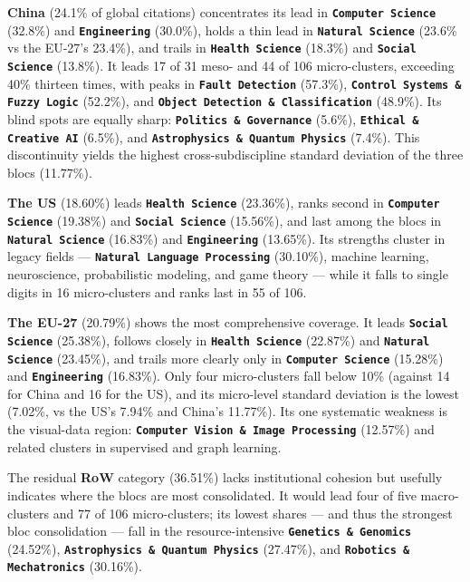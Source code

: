 \documentclass{article}
\begin{document}
	\textbf{China} (24.1\% of global citations) concentrates its lead in \textbf{\texttt{Computer Science}}  (32.8\%) and \textbf{\texttt{Engineering}}  (30.0\%), holds a thin lead in \textbf{\texttt{Natural Science}}  (23.6\% vs the EU-27's 23.4\%), and trails in \textbf{\texttt{Health Science}}  (18.3\%) and \textbf{\texttt{Social Science}}  (13.8\%). It leads 17 of 31 meso- and 44 of 106 micro-clusters, exceeding 40\% thirteen times, with peaks in \textbf{\texttt{Fault Detection}}  (57.3\%), \textbf{\texttt{Control Systems \& Fuzzy Logic}}  (52.2\%), and \textbf{\texttt{Object Detection \& Classification}}  (48.9\%). Its blind spots are equally sharp: \textbf{\texttt{Politics \& Governance}}  (5.6\%), \textbf{\texttt{Ethical \& Creative AI}}  (6.5\%), and \textbf{\texttt{Astrophysics \& Quantum Physics}}  (7.4\%). This discontinuity yields the highest cross-subdiscipline standard deviation of the three blocs (11.77\%).
	
	\textbf{The US} (18.60\%) leads \textbf{\texttt{Health Science}}  (23.36\%), ranks second in \textbf{\texttt{Computer Science}}  (19.38\%) and \textbf{\texttt{Social Science}}  (15.56\%), and last among the blocs in \textbf{\texttt{Natural Science}}  (16.83\%) and \textbf{\texttt{Engineering}}  (13.65\%). Its strengths cluster in legacy fields --- \textbf{\texttt{Natural Language Processing}}  (30.10\%), machine learning, neuroscience, probabilistic modeling, and game theory --- while it falls to single digits in 16 micro-clusters and ranks last in 55 of 106.
	
	\textbf{The EU-27} (20.79\%) shows the most comprehensive coverage. It leads \textbf{\texttt{Social Science}}  (25.38\%), follows closely in \textbf{\texttt{Health Science}}  (22.87\%) and \textbf{\texttt{Natural Science}}  (23.45\%), and trails more clearly only in \textbf{\texttt{Computer Science}}  (15.28\%) and \textbf{\texttt{Engineering}}  (16.83\%). Only four micro-clusters fall below 10\% (against 14 for China and 16 for the US), and its micro-level standard deviation is the lowest (7.02\%, vs the US's 7.94\% and China's 11.77\%). Its one systematic weakness is the visual-data region: \textbf{\texttt{Computer Vision \& Image Processing}}  (12.57\%) and related clusters in supervised and graph learning.
	
	The residual \textbf{RoW} category (36.51\%) lacks institutional cohesion but usefully indicates where the blocs are most consolidated. It would lead four of five macro-clusters and 77 of 106 micro-clusters; its lowest shares --- and thus the strongest bloc consolidation --- fall in the resource-intensive \textbf{\texttt{Genetics \& Genomics}}  (24.52\%), \textbf{\texttt{Astrophysics \& Quantum Physics}}  (27.47\%), and \textbf{\texttt{Robotics \& Mechatronics}}  (30.16\%).
	
\end{document}
